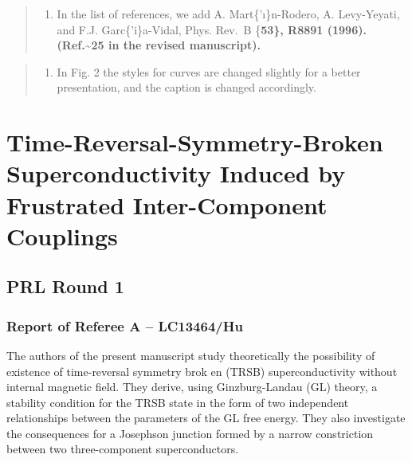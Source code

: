 \documentclass[11pt]{article}
\providecommand{\tightlist}{%
      \setlength{\itemsep}{0pt}\setlength{\parskip}{0pt}}
\begin{document}
\begin{quote}
\begin{enumerate}
\def\labelenumi{(\arabic{enumi})}
\setcounter{enumi}{4}
\tightlist
\item
  In the list of references, we add A. Mart\{'\i\}n-Rodero, A.
  Levy-Yeyati, and F.J. Garc\{'i\}a-Vidal, Phys. Rev.~B \{\bf 53\},
  R8891 (1996). (Ref.\textasciitilde{}25 in the revised manuscript).
\end{enumerate}
\end{quote}

\begin{quote}
\begin{enumerate}
\def\labelenumi{(\arabic{enumi})}
\setcounter{enumi}{5}
\tightlist
\item
  In Fig. 2 the styles for curves are changed slightly for a better
  presentation, and the caption is changed accordingly.
\end{enumerate}
\end{quote}

    \hypertarget{time-reversal-symmetry-broken-superconductivity-induced-by-frustrated-inter-component-couplings}{%
\section{Time-Reversal-Symmetry-Broken Superconductivity Induced by
Frustrated Inter-Component
Couplings}\label{time-reversal-symmetry-broken-superconductivity-induced-by-frustrated-inter-component-couplings}}

\hypertarget{prl-round-1}{%
\subsection{PRL Round 1}\label{prl-round-1}}

\hypertarget{report-of-referee-a-lc13464hu}{%
\subsubsection{Report of Referee A --
LC13464/Hu}\label{report-of-referee-a-lc13464hu}}

The authors of the present manuscript study theoretically the
possibility of existence of time-reversal symmetry brok en (TRSB)
superconductivity without internal magnetic field. They derive, using
Ginzburg-Landau (GL) theory, a stability condition for the TRSB state in
the form of two independent relationships between the parameters of the
GL free energy. They also investigate the consequences for a Josephson
junction formed by a narrow constriction between two three-component
superconductors.
\end{document}
